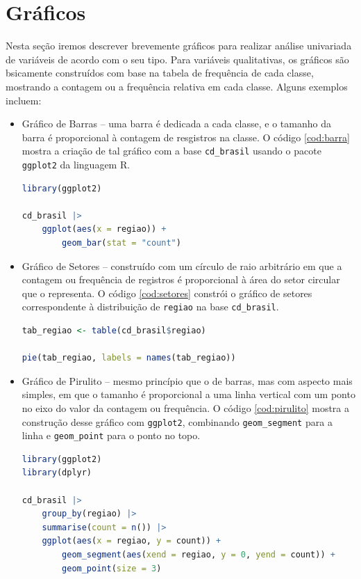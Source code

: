 \section{Gráficos}

Nesta seção iremos descrever brevemente gráficos para realizar análise univariada de
variáveis de acordo com o seu tipo.
Para variáveis qualitativas, os gráficos são bsicamente construídos com base na tabela de
frequência de cada classe, mostrando a contagem ou a frequência relativa em cada classe.
Alguns exemplos incluem:

\begin{itemize}
\item Gráfico de Barras -- uma barra é dedicada a cada classe, e o tamanho da barra é
proporcional à contagem de resgistros na classe.
O código \ref{cod:barra} mostra a criação de tal gráfico com a base \texttt{cd\_brasil}
usando o pacote \texttt{ggplot2} da linguagem R.

\begin{lstlisting}[language=R, caption={Gráfico de Barras}, label={cod:barra}]
library(ggplot2)

cd_brasil |>
    ggplot(aes(x = regiao)) +
        geom_bar(stat = "count")
\end{lstlisting}

\item Gráfico de Setores -- construído com um círculo de raio arbitrário em que a
contagem ou frequência de registros é proporcional à área do setor circular que o
representa.
O código \ref{cod:setores} constrói o gráfico de setores correspondente à distribuição
de \texttt{regiao} na base \texttt{cd\_brasil}.

\begin{lstlisting}[language=R, caption={Gráfico de Setores}, label={cod:setores}]
tab_regiao <- table(cd_brasil$regiao)

pie(tab_regiao, labels = names(tab_regiao))
\end{lstlisting}

\item Gráfico de Pirulito -- mesmo princípio que o de barras, mas com aspecto mais
simples, em que o tamanho é proporcional a uma linha vertical com um ponto no eixo do
valor da contagem ou frequência.
O código \ref{cod:pirulito} mostra a construção desse gráfico com \texttt{ggplot2},
combinando \texttt{geom\_segment} para a linha e \texttt{geom\_point} para o ponto no
topo.

\begin{lstlisting}[language=R, caption={Gráfico de Pirulito}, label={cod:pirulito}]
library(ggplot2)
library(dplyr)

cd_brasil |>
    group_by(regiao) |>
    summarise(count = n()) |>
    ggplot(aes(x = regiao, y = count)) +
        geom_segment(aes(xend = regiao, y = 0, yend = count)) +
        geom_point(size = 3)
\end{lstlisting}
\end{itemize}

